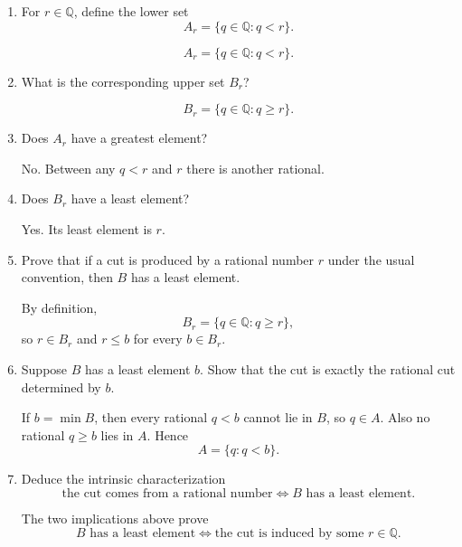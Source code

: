 \documentclass{essay}
\begin{document}
\begin{enumerate}[label=\arabic*., itemsep=10pt]

\item For $r\in\mathbb{Q}$, define the lower set
\[
A_r=\{q\in\mathbb{Q}:q<r\}.
\]

\begin{answer}
\[
A_r=\{q\in\mathbb{Q}:q<r\}.
\]
\end{answer}

\item What is the corresponding upper set $B_r$?

\begin{answer}
\[
B_r=\{q\in\mathbb{Q}:q\ge r\}.
\]
\end{answer}

\item Does $A_r$ have a greatest element?

\begin{answer}
No. Between any $q<r$ and $r$ there is another rational.
\end{answer}

\item Does $B_r$ have a least element?

\begin{answer}
Yes. Its least element is $r$.
\end{answer}

\item Prove that if a cut is produced by a rational number $r$ under the usual convention, then $B$ has a least element.

\begin{answer}
By definition,
\[
B_r=\{q\in\mathbb{Q}:q\ge r\},
\]
so $r\in B_r$ and $r\le b$ for every $b\in B_r$.
\end{answer}

\item Suppose $B$ has a least element $b$. Show that the cut is exactly the rational cut determined by $b$.

\begin{answer}
If $b=\min B$, then every rational $q<b$ cannot lie in $B$, so $q\in A$. Also no rational $q\ge b$ lies in $A$. Hence
\[
A=\{q:q<b\}.
\]
\end{answer}

\item Deduce the intrinsic characterization
\[
\text{the cut comes from a rational number}
\iff
B\text{ has a least element}.
\]

\begin{answer}
The two implications above prove
\[
B\text{ has a least element}
\iff
\text{the cut is induced by some }r\in\mathbb{Q}.
\]
\end{answer}


\end{enumerate}
\end{document}
